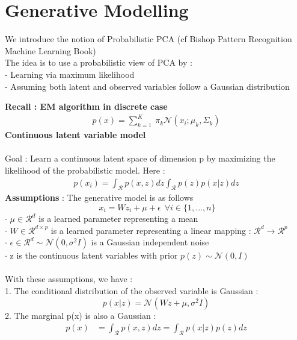 \documentclass{article}
\begin{document}
\section{Generative Modelling}
We introduce the notion of Probabilistic PCA (cf Bishop Pattern Recognition Machine Learning Book) \\
The idea is to use a probabilistic view of PCA by : \\
- Learning via maximum likelihood \\
- Assuming both latent and observed variables follow a Gaussian distribution

\textbf{Recall : EM algorithm in discrete case}
\begin{align*}
    p(x) = \sum_{k=1}^K \ \pi_k \mathcal{N}(x_i; \mu_k, \Sigma_k)
\end{align*}
\textbf{Continuous latent variable model} \\
\\
Goal : Learn a continuous latent space of dimension p by maximizing the likelihood of the probabilistic model. Here :
\begin{align*}
    p(x_i) = \int_{\mathcal{R}} p(x,z) dz \int_{\mathcal{R}} p(z) p(x|z)dz
\end{align*}
\textbf{Assumptions} : The generative model is as follows 
\begin{equation}
     \ x_i = Wz_i + \mu + \epsilon \ \ \forall i \in \{1,...,n\}
\end{equation}
$\cdot$ $\mu \in \mathcal{R}^d$ is a learned parameter representing a mean \\
$\cdot$ $W \in \mathcal{R}^{d \times p}$ is a learned parameter representing a linear mapping : $\mathcal{R}^d \xrightarrow{} \mathcal{R}^p$ \\
$\cdot$ $\epsilon \in \mathcal{R}^d \sim \mathcal{N}(0,\sigma^2 I)$ is a Gaussian independent noise \\
$\cdot$ z is the continuous latent variables with prior $p(z) \sim \mathcal{N}(0,I)$
\\
\\
With these assumptions, we have : \\
1. The conditional distribution of the observed variable is Gaussian :
\begin{equation*}
    p(x|z) = \mathcal{N}(Wz + \mu, \sigma^2 I)
\end{equation*}
2. The marginal p(x) is also a Gaussian :
\begin{align*}
    p(x) &= \int_\mathcal{R} p(x,z) dz = \int_\mathcal{R} p(x|z)p(z)dz \\
\end{align*}
\end{document}
